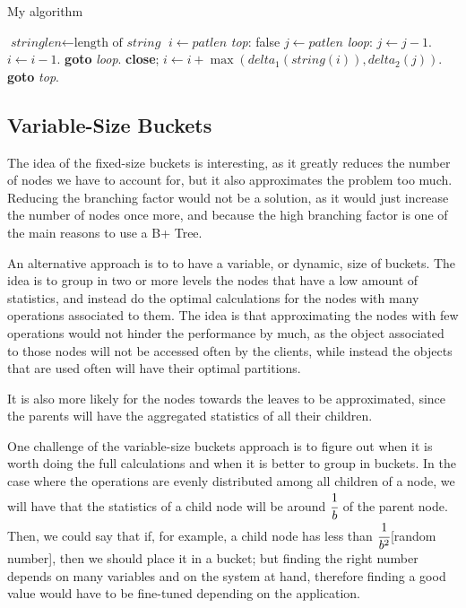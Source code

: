 \begin{algorithm}
  \caption{My algorithm}\label{euclid}
  \begin{algorithmic}[1]
  \State $\textit{stringlen} \gets \text{length of }\textit{string}$
  \State $i \gets \textit{patlen}$
  \State \emph{top}:
   \Return false
  \EndIf
  \State $j \gets \textit{patlen}$
  \State \emph{loop}:
  \State $j \gets j-1$.
  \State $i \gets i-1$.
  \State \textbf{goto} \emph{loop}.
  \State \textbf{close};
  \EndIf
  \State $i \gets i+\max(\textit{delta}_1(\textit{string}(i)),\textit{delta}_2(j))$.
  \State \textbf{goto} \emph{top}.
  \EndProcedure
  \end{algorithmic}
  \end{algorithm}

\subsection{Variable-Size Buckets}\label{sec:variable-size buckets}
The idea of the fixed-size buckets is interesting, as it greatly reduces the number of nodes we have to account for, but it also approximates the problem too much. Reducing the branching factor would not be a solution, as it would just increase the number of nodes once more, and because the high branching factor is one of the main reasons to use a B+ Tree. 

An alternative approach is to to have a variable, or dynamic, size of buckets. The idea is to group in two or more levels the nodes that have a low amount of statistics, and instead do the optimal calculations for the nodes with many operations associated to them. The idea is that approximating the nodes with few operations would not hinder the performance by much, as the object associated to those nodes will not be accessed often by the clients, while instead the objects that are used often will have their optimal partitions.

It is also more likely for the nodes towards the leaves to be approximated, since the parents will have the aggregated statistics of all their children.

One challenge of the variable-size buckets approach is to figure out when it is worth doing the full calculations and when it is better to group in buckets. In the case where the operations are evenly distributed among all children of a node, we will have that the statistics of a child node will be around $\cfrac{1}{b}$ of the parent node. Then, we could say that if, for example, a child node has less than $\cfrac{1}{b^2}$[random number], then we should place it in a bucket; but finding the right number depends on many variables and on the system at hand, therefore finding a good value would have to be fine-tuned depending on the application.

